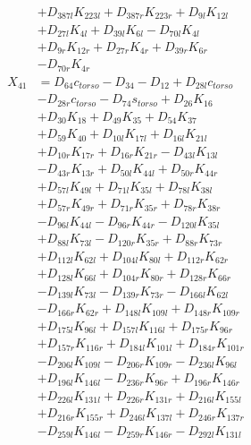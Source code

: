 \begin{multicols}{2}
\begin{align}
&+ D_{387l}K_{223l} + D_{387r}K_{223r} + D_{9l}K_{12l}  \nonumber \\
&+ D_{27l}K_{4l} + D_{39l}K_{6l} - D_{70l}K_{4l}  \nonumber \\
&+ D_{9r}K_{12r} + D_{27r}K_{4r} + D_{39r}K_{6r}  \nonumber \\
&- D_{70r}K_{4r} \nonumber \\
X_{41} &= D_{64}c_{torso} - D_{34} - D_{12} + D_{28l}c_{torso}  \nonumber \\
&- D_{28r}c_{torso} - D_{74}s_{torso} + D_{26}K_{16}  \nonumber \\
&+ D_{30}K_{18} + D_{49}K_{35} + D_{54}K_{37}  \nonumber \\
&+ D_{59}K_{40} + D_{10l}K_{17l} + D_{16l}K_{21l}  \nonumber \\
&+ D_{10r}K_{17r} + D_{16r}K_{21r} - D_{43l}K_{13l}  \nonumber \\
&- D_{43r}K_{13r} + D_{50l}K_{44l} + D_{50r}K_{44r}  \nonumber \\
&+ D_{57l}K_{49l} + D_{71l}K_{35l} + D_{78l}K_{38l}  \nonumber \\
&+ D_{57r}K_{49r} + D_{71r}K_{35r} + D_{78r}K_{38r}  \nonumber \\
&- D_{96l}K_{44l} - D_{96r}K_{44r} - D_{120l}K_{35l}  \nonumber \\
&+ D_{88l}K_{73l} - D_{120r}K_{35r} + D_{88r}K_{73r}  \nonumber \\
&+ D_{112l}K_{62l} + D_{104l}K_{80l} + D_{112r}K_{62r}  \nonumber \\
&+ D_{128l}K_{66l} + D_{104r}K_{80r} + D_{128r}K_{66r}  \nonumber \\
&- D_{139l}K_{73l} - D_{139r}K_{73r} - D_{166l}K_{62l}  \nonumber \\
&- D_{166r}K_{62r} + D_{148l}K_{109l} + D_{148r}K_{109r}  \nonumber \\
&+ D_{175l}K_{96l} + D_{157l}K_{116l} + D_{175r}K_{96r}  \nonumber \\
&+ D_{157r}K_{116r} + D_{184l}K_{101l} + D_{184r}K_{101r}  \nonumber \\
&- D_{206l}K_{109l} - D_{206r}K_{109r} - D_{236l}K_{96l}  \nonumber \\
&+ D_{196l}K_{146l} - D_{236r}K_{96r} + D_{196r}K_{146r}  \nonumber \\
&+ D_{226l}K_{131l} + D_{226r}K_{131r} + D_{216l}K_{155l}  \nonumber \\
&+ D_{216r}K_{155r} + D_{246l}K_{137l} + D_{246r}K_{137r}  \nonumber \\
&- D_{259l}K_{146l} - D_{259r}K_{146r} - D_{292l}K_{131l}  \nonumber \\

\end{align}
\end{multicols}
